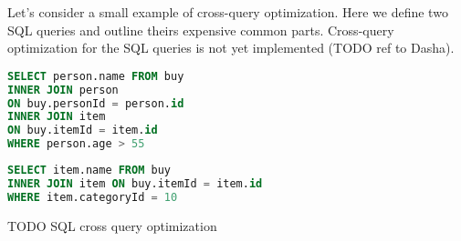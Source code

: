 Let's consider a small example of cross-query optimization.
Here we define two SQL queries and outline theirs expensive common parts.
Cross-query optimization for the SQL queries is not yet implemented (TODO ref to Dasha).

\begin{lstlisting}[language=SQL]
SELECT person.name FROM buy
INNER JOIN person
ON buy.personId = person.id
INNER JOIN item
ON buy.itemId = item.id
WHERE person.age > 55
\end{lstlisting}

\begin{lstlisting}[language=SQL]
SELECT item.name FROM buy
INNER JOIN item ON buy.itemId = item.id
WHERE item.categoryId = 10
\end{lstlisting}

TODO SQL cross query optimization
